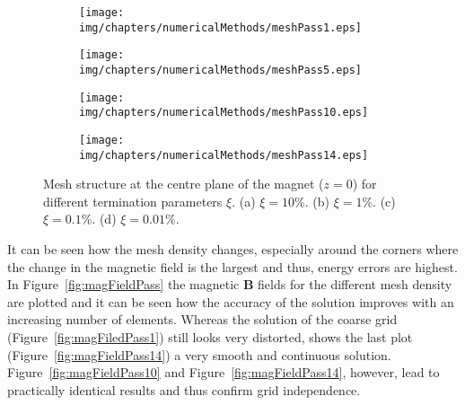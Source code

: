 \begin{figure}[htb]
        \centering
        \begin{subfigure}[b]{0.47\textwidth}
                \texttt{[image: img/chapters/numericalMethods/meshPass1.eps]}
                \caption{}
                \label{fig:meshPass1}
        \end{subfigure}
        \begin{subfigure}[b]{0.47\textwidth}
                \texttt{[image: img/chapters/numericalMethods/meshPass5.eps]}
                \caption{}
                \label{fig:meshPass5}
        \end{subfigure}
        \begin{subfigure}[b]{0.47\textwidth}
                \texttt{[image: img/chapters/numericalMethods/meshPass10.eps]}
                \caption{}
                \label{fig:meshPass10}
        \end{subfigure}
        \begin{subfigure}[b]{0.47\textwidth}
                \texttt{[image: img/chapters/numericalMethods/meshPass14.eps]}
                \caption{}
                \label{fig:meshPass14}
        \end{subfigure}
        \caption[FEM unstructured mesh at the magnet's centre plane]{Mesh structure at the centre plane of the magnet ($z=0$) for different termination parameters $\xi$. (a) $\xi=10\%$. (b) $\xi=1\%$. (c) $\xi=0.1\%$. (d) $\xi=0.01\%$.}
        \label{fig:meshPass}
\end{figure}

It can be seen how the mesh density changes, especially around the corners where the change in the magnetic field is the largest and thus, energy errors are highest. In Figure~\ref{fig:magFieldPass} the magnetic $\mathbf{B}$ fields for the different mesh density are plotted and it can be seen how the accuracy of the solution improves with an increasing number of elements. Whereas the solution of the coarse grid (Figure~\ref{fig:magFiledPass1}) still looks very distorted, shows the last plot (Figure~\ref{fig:magFieldPass14}) a very smooth and continuous solution. Figure~\ref{fig:magFieldPass10} and Figure~\ref{fig:magFieldPass14}, however, lead to practically identical results and thus confirm grid independence. 

